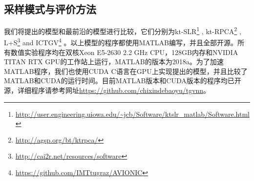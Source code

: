 \subsection{采样模式与评价方法}
我们将提出的模型和最前沿的模型进行比较，它们分别为kt-SLR\footnote{\url{http://user.engineering.uiowa.edu/~jcb/Software/ktslr_matlab/Software.html}} \cite{Sajan2011Accelerated}, kt-RPCA\footnote{\url{http://agsp.org/bt/ktrpca/}} \cite{tremoulheac}, L+S\footnote{\url{http://cai2r.net/resources/software}} \cite{lpluss} and ICTGV\footnote{\url{https://github.com/IMTtugraz/AVIONIC}} \cite{infimaltgv}。以上模型的程序都使用MATLAB编写，并且全部开源。所有数值实验程序均在双核Xeon E5-2630 2.2 GHz CPU，128GB内存和NVIDIA TITAN RTX GPU的工作站上运行，MATLAB的版本为2018a。为了加速MATLAB程序，我们也使用CUDA C语言在GPU上实现提出的模型，并且比较了MATLAB和CUDA的运行时间。目前MATLAB版本和CUDA版本的程序均已开源，详细程序请参考网址\url{https://github.com/chixindebaoyu/tgvnn}。

